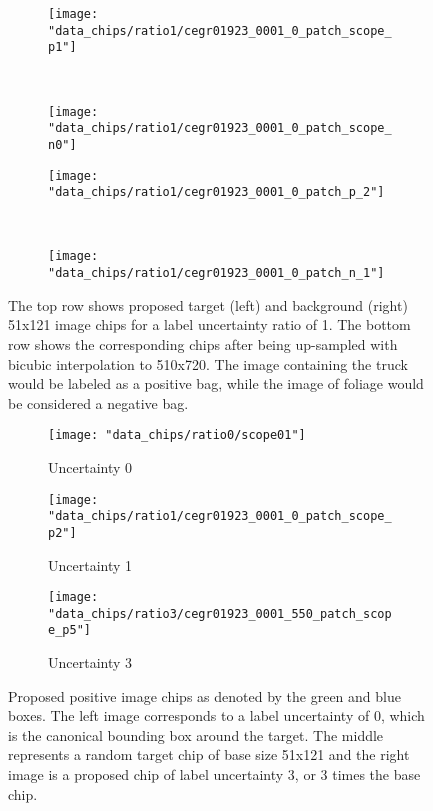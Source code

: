 \begin{figure*}[t!]
	\hfill
	\begin{subfigure}[t]{0.5\textwidth}
		\texttt{[image: "data\_chips/ratio1/cegr01923\_0001\_0\_patch\_scope\_p1"]}
	\end{subfigure}%
	\centering
	~ 
	\begin{subfigure}[t]{0.5\textwidth}
		\centering
		\texttt{[image: "data\_chips/ratio1/cegr01923\_0001\_0\_patch\_scope\_n0"]}
	\end{subfigure}
	
	
	\begin{subfigure}[t]{0.5\textwidth}
		\texttt{[image: "data\_chips/ratio1/cegr01923\_0001\_0\_patch\_p\_2"]}
	\end{subfigure}%
	\centering
	~ 
	\begin{subfigure}[t]{0.5\textwidth}
		\centering
		\texttt{[image: "data\_chips/ratio1/cegr01923\_0001\_0\_patch\_n\_1"]}
	\end{subfigure}%
	\caption[Image Chip Extraction]{The top row shows proposed target (left) and background (right) 51x121 image chips for a label uncertainty ratio of 1. The bottom row shows the corresponding chips after being up-sampled with bicubic interpolation to 510x720.  The image containing the truck would be labeled as a positive bag, while the image of foliage would be considered a negative bag. }
	\label{fig:chip_extraction}%
\end{figure*}


\begin{figure*}[t!]
	\hfill
	\begin{subfigure}[t]{0.3\textwidth}
		\texttt{[image: "data\_chips/ratio0/scope01"]}
		\caption{Uncertainty 0}
	\end{subfigure}%
	\hfill
	\begin{subfigure}[t]{0.3\textwidth}
		\texttt{[image: "data\_chips/ratio1/cegr01923\_0001\_0\_patch\_scope\_p2"]}
		\caption{Uncertainty 1}
	\end{subfigure}
	\hfill
	\begin{subfigure}[t]{0.3\textwidth}
		\texttt{[image: "data\_chips/ratio3/cegr01923\_0001\_550\_patch\_scope\_p5"]}
		\caption{Uncertainty 3}
	\end{subfigure}%
	
	\caption[Image Chip Uncertainty]{Proposed positive image chips as denoted by the green and blue boxes.  The left image corresponds to a label uncertainty of 0, which is the canonical bounding box around the target.  The middle represents a random target chip of base size 51x121 and the right image is a proposed chip of label uncertainty 3, or 3 times the base chip.}
	\label{fig:chip_uncertainty}%
\end{figure*}



